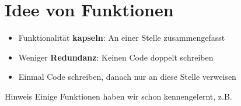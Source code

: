 \section{Idee von Funktionen}
\begin{frame}
    \slidehead

    \begin{itemize}
        \item Funktionalität \textbf{kapseln}: An einer Stelle zusammengefasst
        \item Weniger \textbf{Redundanz}: Keinen Code doppelt schreiben
        \item Einmal Code schreiben, danach nur an diese Stelle verweisen
    \end{itemize}
    \vspace{1cm}
    \begin{block}{Hinweis}
        Einige Funktionen haben wir schon kennengelernt, z.B. 
    \end{block}
\end{frame}


\subtitle{Kapitel 6: wie Funktionen funktionieren}


